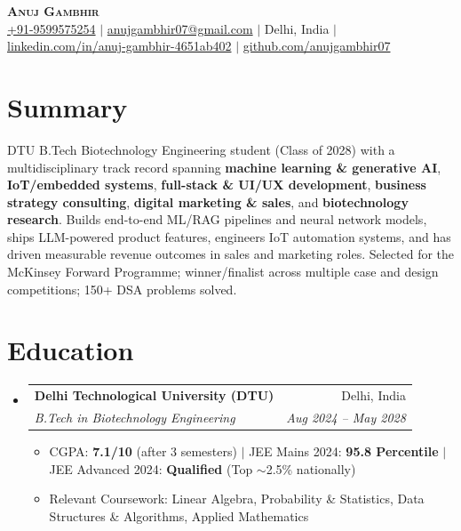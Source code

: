 \documentclass[letterpaper,10.5pt]{article}
\makeatletter
\newcommand{\resumeItem}[1]{
  \item\small{#1 \vspace{-2pt}}
}
\newcommand{\resumeSubheading}[4]{
  \vspace{-2pt}\item
    \begin{tabular*}{0.97\textwidth}[t]{l@{\extracolsep{\fill}}r}
      \textbf{#1} & \small #2 \\
      \textit{\small#3} & \textit{\small #4} \\
    \end{tabular*}\vspace{-5pt}
}
\newcommand{\resumeSubHeadingListStart}{\begin{itemize}[leftmargin=0.12in, label={}]}
\newcommand{\resumeSubHeadingListEnd}{\end{itemize}}
\newcommand{\resumeItemListStart}{\begin{itemize}[leftmargin=0.18in]}
\newcommand{\resumeItemListEnd}{\end{itemize}\vspace{-4pt}}
\makeatother
\begin{document}
\begin{center}
    {\LARGE \scshape \textbf{Anuj Gambhir}} \\ \vspace{3pt}
    \small
    \href{tel:9599575254}{+91-9599575254} $|$
    \href{mailto:anujgambhir07@gmail.com}{anujgambhir07@gmail.com} $|$
    Delhi, India $|$
    \href{https://www.linkedin.com/in/anuj-gambhir-4651ab402/}{linkedin.com/in/anuj-gambhir-4651ab402} $|$
    \href{https://www.github.com/anujgambhir07}{github.com/anujgambhir07}
\end{center}
\vspace{-12pt}

\section{Summary}
\small{DTU B.Tech Biotechnology Engineering student (Class of 2028) with a multidisciplinary track record spanning \textbf{machine learning \& generative AI}, \textbf{IoT/embedded systems}, \textbf{full-stack \& UI/UX development}, \textbf{business strategy consulting}, \textbf{digital marketing \& sales}, and \textbf{biotechnology research}. Builds end-to-end ML/RAG pipelines and neural network models, ships LLM-powered product features, engineers IoT automation systems, and has driven measurable revenue outcomes in sales and marketing roles. Selected for the McKinsey Forward Programme; winner/finalist across multiple case and design competitions; 150+ DSA problems solved.}
\vspace{-4pt}

\section{Education}
\resumeSubHeadingListStart
  \resumeSubheading
    {Delhi Technological University (DTU)}{Delhi, India}
    {B.Tech in Biotechnology Engineering}{Aug 2024 -- May 2028}
    \resumeItemListStart
      \resumeItem{CGPA: \textbf{7.1/10} (after 3 semesters) $|$ JEE Mains 2024: \textbf{95.8 Percentile} $|$ JEE Advanced 2024: \textbf{Qualified} (Top $\sim$2.5\% nationally)}
      \resumeItem{Relevant Coursework: Linear Algebra, Probability \& Statistics, Data Structures \& Algorithms, Applied Mathematics}
    \resumeItemListEnd
\resumeSubHeadingListEnd
\vspace{-6pt}

\end{document}

